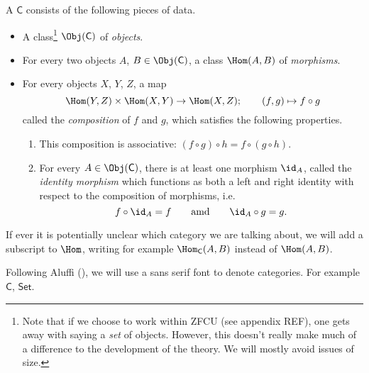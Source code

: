 \documentclass[main.tex]{subfiles}
\begin{document}
\begin{definition}[category]
  \label{def:category}
  A  $\mathsf{C}$ consists of the following pieces of data.
  \begin{itemize}
    \item A class\footnote{Note that if we choose to work within ZFCU (see appendix REF), one gets away with saying a \emph{set} of objects. However, this doesn't really make much of a difference to the development of the theory. We will mostly avoid issues of size.} $\Obj(\mathsf{C})$ of \emph{objects}.

    \item For every two objects $A$, $B \in \Obj(\mathsf{C})$, a class $\Hom(A,B)$ of \emph{morphisms\/}.

    \item\label{item:compositionofmorphisms}
      For every objects $X$, $Y$, $Z$, a map
      \begin{equation*}
        \Hom(Y, Z) \times \Hom(X, Y) \to \Hom(X, Z);\qquad (f, g) \mapsto f \circ g
      \end{equation*}
      called the \emph{composition\/} of $f$ and $g$, which satisfies the following properties.
      \begin{enumerate}
        \item This composition is associative: $(f \circ g) \circ h = f \circ (g \circ h)$.

        \item\label{item:existenceofidentitymorphism} For every $A \in \Obj(\mathsf{C})$, there is at least one morphism $\id_{A}$, called the \emph{identity morphism\/} which functions as both a left and right identity with respect to the composition of morphisms, i.e.\
          \begin{equation*}
            f \circ \id_{A} = f\qquad\text{amd}\qquad \id_{A} \circ g = g.
          \end{equation*}
      \end{enumerate}
  \end{itemize}

  If ever it is potentially unclear which category we are talking about, we will add a subscript to $\Hom$, writing for example $\Hom_{\mathsf{C}}(A,B)$ instead of $\Hom(A,B)$.
\end{definition}

\begin{notation}
  Following Aluffi (\cite{aluffi-algebra-chapter-0}), we will use a sans serif font to denote categories. For example $\mathsf{C}$, $\mathsf{Set}$.
\end{notation}
\end{document}

